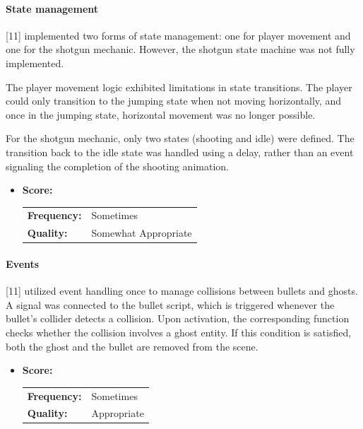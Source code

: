 \paragraph{State management}

[11] implemented two forms of state management: one for player movement and one for the shotgun mechanic.
However, the shotgun state machine was not fully implemented.

The player movement logic exhibited limitations in state transitions.
The player could only transition to the jumping state when not moving horizontally, and once in the jumping state, horizontal movement was no longer possible.

For the shotgun mechanic, only two states (shooting and idle) were defined.
The transition back to the idle state was handled using a delay, rather than an event signaling the completion of the shooting animation.

\begin{itemize}
    \item \textbf{Score:}
    \begin{tabular}{ll}
        \textbf{Frequency:} & Sometimes \\
        \textbf{Quality:}   & Somewhat Appropriate \\
    \end{tabular}
\end{itemize}

\paragraph{Events}

[11] utilized event handling once to manage collisions between bullets and ghosts.
A signal was connected to the bullet script, which is triggered whenever the bullet’s collider detects a collision.
Upon activation, the corresponding function checks whether the collision involves a ghost entity.
If this condition is satisfied, both the ghost and the bullet are removed from the scene.


\begin{itemize}
    \item \textbf{Score:}
    \begin{tabular}{ll}
        \textbf{Frequency:} & Sometimes \\
        \textbf{Quality:}   & Appropriate \\
    \end{tabular}
\end{itemize}


